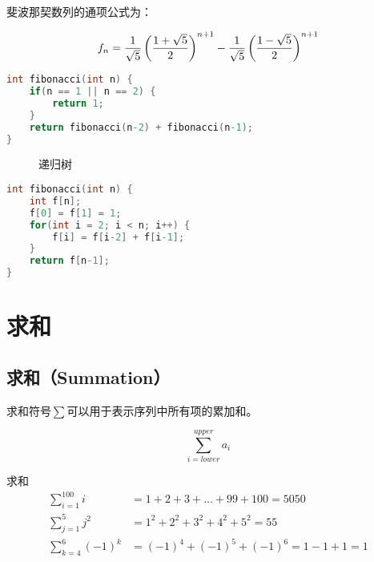 \documentclass[12pt, openany, oneside]{book}
\begin{document}
斐波那契数列的通项公式为：

$$
	f_n = {1 \over \sqrt{5}} \left({1 + \sqrt{5} \over 2} \right)^{n+1} - {1 \over \sqrt{5}} \left({1 - \sqrt{5} \over 2} \right)^{n+1}
$$

\begin{lstlisting}[language=C, title=斐波那契数列（递归）]
int fibonacci(int n) {
	if(n == 1 || n == 2) {
		return 1;
	}
	return fibonacci(n-2) + fibonacci(n-1);
}
\end{lstlisting}

\begin{figure}[H]
	\centering
	\caption{递归树}
\end{figure}

\begin{lstlisting}[language=C, title=斐波那契数列（迭代）]
int fibonacci(int n) {
	int f[n];
	f[0] = f[1] = 1;
	for(int i = 2; i < n; i++) {
		f[i] = f[i-2] + f[i-1];
	}
	return f[n-1];
}
\end{lstlisting}

\newpage

\section{求和}

\subsection{求和（Summation）}

求和符号$ \sum $可以用于表示序列中所有项的累加和。

$$
	\sum_{i=lower}^{upper} a_i
$$

\begin{tcolorbox}\nonumber
	求和
	\begin{align}
		\sum_{i=1}^{100} i    & = 1 + 2 +3 + \dots + 99 + 100 = 5050       \\
		\sum_{j=1}^{5} j^2    & = 1^2 + 2^2 + 3^2 + 4^2 + 5^2 = 55         \\
		\sum_{k=4}^{6} (-1)^k & = (-1)^4 + (-1)^5 + (-1)^6 = 1 - 1 + 1 = 1
	\end{align}
\end{tcolorbox}
\end{document}
